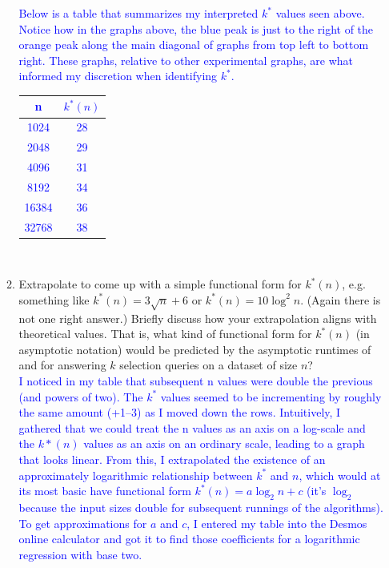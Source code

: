 \documentclass[11pt]{article}
\begin{document}
\begin{enumerate}
\begin{enumerate}
\textcolor{blue}{
Below is a table that summarizes my interpreted $k^*$ values seen above. Notice how in the graphs above, the blue peak is just to the right of the orange peak along the main diagonal of graphs from top left to bottom right. These graphs, relative to other experimental graphs, are what informed my discretion when identifying $k^*$. 
}\\

\textcolor{blue}{
\begin{tabular}{| c | c |}
\hline
n       & $k^*(n)$       \\ \hline
1024   & 28   \\ \hline
2048   & 29  \\ \hline
4096   & 31   \\ \hline
8192   & 34  \\ \hline
16384   & 36  \\ \hline
32768   & 38  \\ \hline
\end{tabular}
} \\
        
        \item Extrapolate to come up with a simple functional form for $k^*(n)$, e.g. something like $k^*(n)=3\sqrt{n}+6$ or $k^*(n)=10\log^2 n$. (Again there is not one right answer.)  Briefly discuss how your extrapolation aligns with theoretical values. That is, what kind of functional form for $k^*(n)$ (in asymptotic notation) would be predicted by  the asymptotic runtimes of \QuickSelect{} and \MergeSortSelect{} for answering $k$ selection queries on a dataset of size $n$? \\

\textcolor{blue}{
        I noticed in my table that subsequent n values were double the previous (and powers of two). The $k^*$ values seemed to be incrementing by roughly the same amount (+1–3) as I moved down the rows. Intuitively, I gathered that we could treat the n values as an axis on a log-scale and the $k*(n)$ values as an axis on an ordinary scale, leading to a graph that looks linear. From this, I extrapolated the existence of an approximately logarithmic relationship between $k^*$ and $n$, which would at its most basic have functional form $k^*(n) = a\log_2{n} + c$ (it's 
        $\log_2$ because the input sizes double for subsequent runnings of the algorithms).} \\

\textcolor{blue}{
        To get approximations for $a$ and $c$, I entered my table into the Desmos online calculator and got it to find those coefficients for a logarithmic regression with base two.} \\
    


\end{enumerate}
\end{enumerate}
\end{document}
